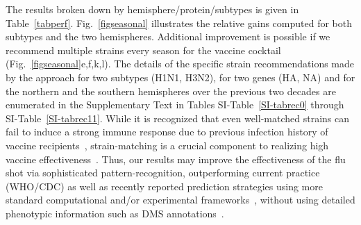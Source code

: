 \documentclass[onecolumn, compsoc,10pt]{IEEEtran}
\begin{document}
%
The  results  broken down by hemisphere/protein/subtypes is given in Table~\ref{tabperf}. Fig.~\ref{figseasonal} illustrates the relative gains computed for both subtypes and the two hemispheres. %
Additional improvement is possible if we recommend multiple strains every season for the vaccine cocktail (Fig.~\ref{figseasonal}e,f,k,l). The details of the specific strain  recommendations made by the \enet approach for two subtypes (H1N1, H3N2), for two genes (HA, NA) and for the northern and the southern hemispheres over the previous two decades are enumerated in the Supplementary Text in Tables SI-Table~\ref{SI-tabrec0} through SI-Table~\ref{SI-tabrec11}. While it is recognized that even well-matched strains can fail to induce a strong immune response due to previous infection history of vaccine recipients~\cite{cobey2018poor}, strain-matching is a crucial component to realizing high vaccine effectiveness~\cite{gouma2020antigenic}. Thus, our results may improve the effectiveness of the flu shot via sophisticated  pattern-recognition, outperforming current practice (WHO/CDC) as well as  recently reported prediction strategies  using more standard computational and/or experimental frameworks~\cite{huddleston2020integrating,neher2014predicting},  without using  detailed phenotypic information such as DMS annotations~\cite{huddleston2020integrating,neher2014predicting}.

\end{document}
